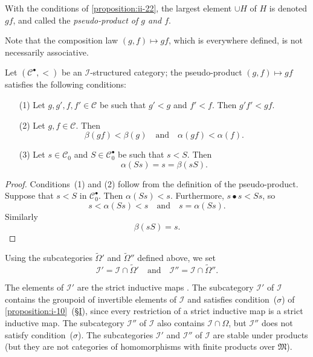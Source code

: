 \documentclass[a4paper,fleqn]{article}
\theoremstyle{plain}
\newenvironment{proposition}[1]
  {\renewcommand\theinnerproposition{#1}\innerproposition}
  {\endinnerproposition}
\theoremstyle{definition}
\newenvironment{definition}[1]
  {\renewcommand\theinnerdefinition{#1}\innerdefinition}
  {\endinnerdefinition}
\newcommand{\oldpage}[1]{{\marginpar{\footnotesize$\bigg\vert$\,\,\,\,\textit{p.~#1}}}}
\newcommand{\textand}{\quad\text{and}\quad}
\newcommand{\CC}{\mathcal{C}}
\newcommand{\MM}{\mathfrak{M}}
\newcommand{\II}{\mathcal{I}}
\begin{document}
\begin{definition}{20}
\label{definition:ii-20}
  With the conditions of \cref{proposition:ii-22}, the largest element $\cup H$ of $H$ is denoted $gf$, and called the \emph{pseudo-product of $g$ and $f$}.
\end{definition}

Note that the composition law $(g,f)\mapsto gf$, which is everywhere defined, is not necessarily associative.

\begin{proposition}{23}
\label{proposition:ii-23}
  Let $(\CC^\bullet,<)$ be an $\II$-structured category;
  the pseudo-product $(g,f)\mapsto gf$ satisfies the following conditions:
  \begin{enumerate}
    \item[\normalfont(1)]
      Let $g,g',f,f'\in\CC$ be such that $g'<g$ and $f'<f$.
      Then $g'f'<gf$.
    \item[\normalfont(2)]
      Let $g,f\in\CC$.
      Then
      \[
        \beta(gf)<\beta(g)
        \textand
        \alpha(gf)<\alpha(f).
      \]
    \item[\normalfont(3)]
      \oldpage{405}
      Let $s\in\CC_0$ and $S\in\CC_0^\bullet$ be such that $s<S$.
      Then
      \[
        \alpha(Ss)
        = s
        = \beta(sS).
      \]
  \end{enumerate}
\end{proposition}

\begin{proof}
  Conditions~(1) and (2) follow from the definition of the pseudo-product.
  Suppose that $s<S$ in $\CC_0^\bullet$.
  Then $\alpha(Ss)<s$.
  Furthermore, $s\bullet s<Ss$, so
  \[
    s < \alpha(Ss) < s
    \textand
    s = \alpha(Ss).
  \]
  Similarly
  \[
    \beta(sS)
    = s.
  \]
\end{proof}

Using the subcategories $\widetilde{\Omega}'$ and $\widetilde{\Omega}''$ defined above, we set
\[
  \II' = \II\cap\widetilde{\Omega}'
  \textand
  \II'' = \II\cap\widetilde{\Omega}''.
\]

The elements of $\II'$ are the strict inductive maps \cite{3a}.
The subcategory $\II'$ of $\II$ contains the groupoid of invertible elements of $\II$ and satisfies condition~($\sigma$) of \cref{proposition:i-10}~(\hyperref[section:i]{§I}), since every restriction of a strict inductive map is a strict inductive map.
The subcategory $\II''$ of $\II$ also contains $\II\cap\Omega$, but $\II''$ does not satisfy condition~($\sigma$).
The subcategories $\II'$ and $\II''$ of $\II$ are stable under products (but they are not categories of homomorphisms with finite products over $\MM$).
\end{document}
